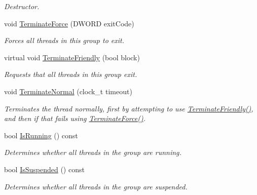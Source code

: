 \begin{DoxyCompactItemize}
\begin{DoxyCompactList}\small\item\em Destructor. \item\end{DoxyCompactList}\item 
void \hyperlink{class_thread_single_group_a61f00b3cd9642ab084b306a9302b1389}{TerminateForce} (DWORD exitCode)
\begin{DoxyCompactList}\small\item\em Forces all threads in this group to exit. \item\end{DoxyCompactList}\item 
virtual void \hyperlink{class_thread_single_group_a8e2284f495d54bb5b924e60dd40c57bf}{TerminateFriendly} (bool block)
\begin{DoxyCompactList}\small\item\em Requests that all threads in this group exit. \item\end{DoxyCompactList}\item 
void \hyperlink{class_thread_single_group_a482c5c07a7eb8fa416d7e4390485ed47}{TerminateNormal} (clock\_\-t timeout)
\begin{DoxyCompactList}\small\item\em Terminates the thread normally, first by attempting to use \hyperlink{class_thread_single_group_a8e2284f495d54bb5b924e60dd40c57bf}{TerminateFriendly()}, and then if that fails using \hyperlink{class_thread_single_group_a61f00b3cd9642ab084b306a9302b1389}{TerminateForce()}. \item\end{DoxyCompactList}\item 
bool \hyperlink{class_thread_single_group_a96cc9b3b041011cd4e6e416a7a3e047e}{IsRunning} () const 
\begin{DoxyCompactList}\small\item\em Determines whether all threads in the group are running. \item\end{DoxyCompactList}\item 
bool \hyperlink{class_thread_single_group_a95b7684ba22a7ece84515ce3cbb67294}{IsSuspended} () const 
\begin{DoxyCompactList}\small\item\em Determines whether all threads in the group are suspended. \item\end{DoxyCompactList}\item 

\end{DoxyCompactItemize}
